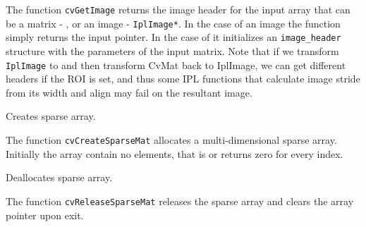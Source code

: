 \begin{description}
\end{description}

The function \texttt{cvGetImage} returns the image header for the input array
that can be a matrix - , or an image - \texttt{IplImage*}. In
the case of an image the function simply returns the input pointer. In the
case of  it initializes an \texttt{image\_header} structure
with the parameters of the input matrix. Note that if we transform
\texttt{IplImage} to  and then transform CvMat back to
IplImage, we can get different headers if the ROI is set, and thus some
IPL functions that calculate image stride from its width and align may
fail on the resultant image.

\label{CreateSparseMat}

Creates sparse array.


\begin{description}
\end{description}

The function \texttt{cvCreateSparseMat} allocates a multi-dimensional sparse array. Initially the array contain no elements, that is  or  returns zero for every index.

\label{ReleaseSparseMat}

Deallocates sparse array.


\begin{description}
\end{description}


The function \texttt{cvReleaseSparseMat} releases the sparse array and clears the array pointer upon exit.


